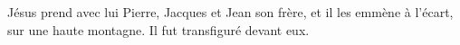 \encetemps Jésus prend avec lui Pierre, Jacques et Jean son frère,
	et il les emmène à l’écart, sur une haute montagne.
Il fut transfiguré devant eux.
